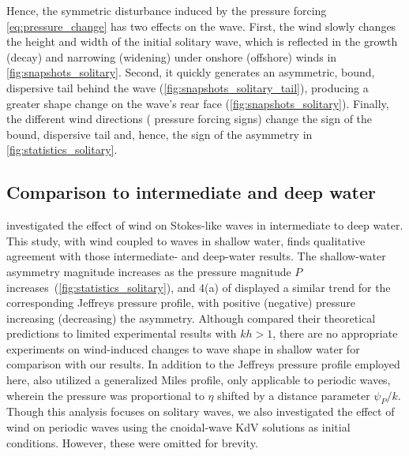 \documentclass{jfm}
\begin{document}
Hence, the symmetric disturbance induced by the pressure forcing
\cref{eq:pressure_change} has two effects on the wave.
First, the wind slowly changes the height and width of the initial
solitary wave, which is reflected in the growth (decay) and narrowing
(widening) under onshore (offshore) winds in
\cref{fig:snapshots_solitary}.
Second, it quickly generates an asymmetric, bound, dispersive tail
behind the wave (\cref{fig:snapshots_solitary_tail}), producing a
greater shape change on the wave's rear face
(\cref{fig:snapshots_solitary}).
Finally, the different wind directions (\ie{} pressure forcing signs)
change the sign of the bound, dispersive tail and, hence, the sign of
the asymmetry in \cref{fig:statistics_solitary}.

\subsection{Comparison to intermediate and deep water}
 investigated the effect of
wind on Stokes-like waves in intermediate to deep water.
This study, with wind coupled to waves in shallow water, finds
qualitative agreement with those intermediate- and deep-water results.
The shallow-water asymmetry magnitude increases as the pressure
magnitude $P$ increases~(\cref{fig:statistics_solitary}), and \figname{}
4(a) of \citet{zdyrski2020wind} displayed a similar trend for the
corresponding Jeffreys pressure profile, with positive (negative)
pressure increasing (decreasing) the asymmetry.
Although \citet{zdyrski2020wind} compared their theoretical
predictions to limited experimental results with $kh > 1$, there are no
appropriate experiments on wind-induced changes to wave shape in shallow
water for comparison with our results.
In addition to the Jeffreys pressure profile employed here,
\citet{zdyrski2020wind} also utilized a generalized Miles profile,
only applicable to periodic waves, wherein the pressure was proportional
to $\eta$ shifted by a distance parameter $\psi_P/k$.
Though this analysis focuses on solitary waves, we also investigated the
effect of wind on periodic waves using the cnoidal-wave KdV solutions as
initial conditions.
However, these were omitted for brevity.
\end{document}
